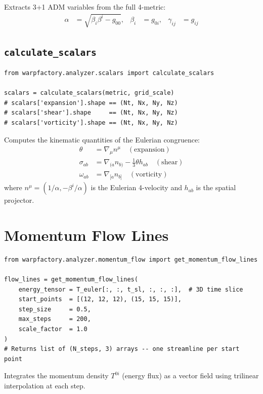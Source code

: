 \documentclass[11pt, a4paper, twoside]{report}
\begin{document}
Extracts 3+1 ADM variables from the full 4-metric:
\begin{align}
  \alpha &= \sqrt{\beta_i\beta^i - g_{00}}, &
  \beta_i &= g_{0i}, &
  \gamma_{ij} &= g_{ij}
\end{align}

\subsection{\texttt{calculate\_scalars}}

\begin{lstlisting}
from warpfactory.analyzer.scalars import calculate_scalars

scalars = calculate_scalars(metric, grid_scale)
# scalars['expansion'].shape == (Nt, Nx, Ny, Nz)
# scalars['shear'].shape     == (Nt, Nx, Ny, Nz)
# scalars['vorticity'].shape == (Nt, Nx, Ny, Nz)
\end{lstlisting}

Computes the kinematic quantities of the Eulerian congruence:
\begin{align}
  \theta &= \nabla_\mu n^\mu \quad (\text{expansion}) \\
  \sigma_{ab} &= \nabla_{(a}n_{b)} - \tfrac{1}{3}\theta h_{ab}
                \quad (\text{shear}) \\
  \omega_{ab} &= \nabla_{[a}n_{b]} \quad (\text{vorticity})
\end{align}
where $n^\mu = (1/\alpha, -\beta^i/\alpha)$ is the Eulerian 4-velocity
and $h_{ab}$ is the spatial projector.

\section{Momentum Flow Lines}

\begin{lstlisting}
from warpfactory.analyzer.momentum_flow import get_momentum_flow_lines

flow_lines = get_momentum_flow_lines(
    energy_tensor = T_euler[:, :, t_sl, :, :, :],  # 3D time slice
    start_points  = [(12, 12, 12), (15, 15, 15)],
    step_size     = 0.5,
    max_steps     = 200,
    scale_factor  = 1.0
)
# Returns list of (N_steps, 3) arrays -- one streamline per start point
\end{lstlisting}

Integrates the momentum density $T^{0i}$ (energy flux) as a vector
field using trilinear interpolation at each step.

\end{document}
